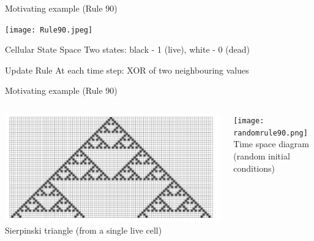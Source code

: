 \begin{frame}{Motivating example (Rule 90)}
  \begin{exampleblock}{}
      \centering
    \texttt{[image: Rule90.jpeg]}
  \end{exampleblock}
  \begin{block}{Cellular State Space}
  Two states: black - 1 (live), white  - 0 (dead)
  \end{block}
  \begin{block}{Update Rule}
    At each time step: XOR of two neighbouring values
  \end{block}
\end{frame}

\begin{frame}{Motivating example (Rule 90)}
\begin{columns}
    \begin{column}{0.5\textwidth}
                \includegraphics[width = 1.0\textwidth]{slike/rule90evolution.jpeg}
                Sierpinski triangle (from a single live cell)
    \end{column}
    \begin{column}{0.5\textwidth}
                    \texttt{[image: randomrule90.png]}
                    Time space diagram (random initial conditions)
    \end{column}
\end{columns}

\end{frame}

